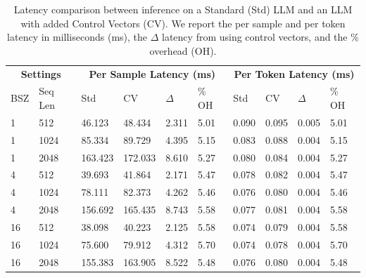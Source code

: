\begin{table}[ht]
\centering
\footnotesize
\begin{tabular}{ll|llll|llll}
\multicolumn{2}{c|}{\textbf{Settings}}&
\multicolumn{4}{c|}{\textbf{Per Sample Latency (ms)}} &
\multicolumn{4}{c}{\textbf{Per Token Latency (ms)}} \\
BSZ & Seq Len &
Std & CV & $\Delta$ & \% OH &
Std & CV & $\Delta$ & \% OH \\
\hline
1  & 512  & 46.123 & 48.434 & 2.311 & 5.01 &
0.090 & 0.095 & 0.005 & 5.01 \\
1  & 1024 & 85.334 & 89.729 & 4.395 & 5.15 &
0.083 & 0.088 & 0.004 & 5.15 \\
1  & 2048 & 163.423 & 172.033 & 8.610 & 5.27 &
0.080 & 0.084 & 0.004 & 5.27 \\
\hline
4  & 512  & 39.693 & 41.864 & 2.171 & 5.47 &
0.078 & 0.082 & 0.004 & 5.47 \\
4  & 1024 & 78.111 & 82.373 & 4.262 & 5.46 &
0.076 & 0.080 & 0.004 & 5.46 \\
4  & 2048 & 156.692 & 165.435 & 8.743 & 5.58 &
0.077 & 0.081 & 0.004 & 5.58 \\
\hline
16 & 512  & 38.098 & 40.223 & 2.125 & 5.58 &
0.074 & 0.079 & 0.004 & 5.58 \\
16 & 1024 & 75.600 & 79.912 & 4.312 & 5.70 &
0.074 & 0.078 & 0.004 & 5.70 \\
16 & 2048 & 155.383 & 163.905 & 8.522 & 5.48 &
0.076 & 0.080 & 0.004 & 5.48 \\
\end{tabular}
\caption[Latency comparison between inference on a Standard LLM and an LLM with added Control Vectors.]{Latency comparison between inference on a Standard (Std) LLM and an LLM with added Control Vectors (CV). We report the per sample and per token latency in milliseconds (ms), the $\Delta$ latency from using control vectors, and the \% overhead (OH).}
\label{tbl:latency-results}
\end{table}
